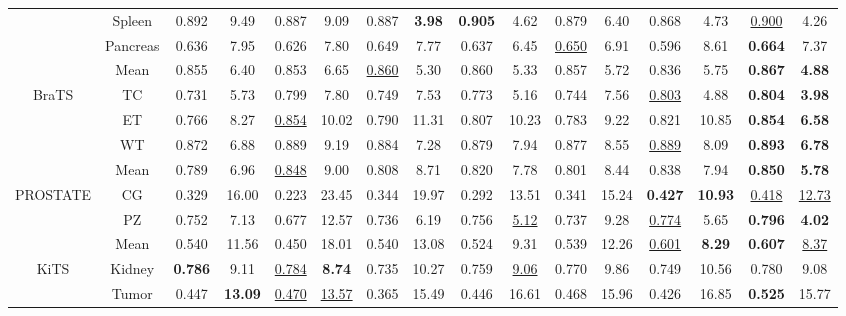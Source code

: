 \documentclass[twocolumn,final,10pt]{elsarticle}
\newcommand\und[1]{\underline{#1}}
\newcommand{\rev}[1]{{\color{black}#1}}
\begin{document}
\begin{table}[h!]
\begin{tabular}{c|c|cccccccccccccc}
 & Spleen & 0.892 & 9.49 & 0.887 & 9.09 & 0.887 & \textbf{3.98} & \textbf{0.905} & 4.62 & 0.879 & 6.40 & 0.868 & 4.73 & \und{0.900} & 4.26\\
 & Pancreas & 0.636 & 7.95 & 0.626 & 7.80 & 0.649 & 7.77 & 0.637 & 6.45 & \und{0.650} & 6.91 & 0.596 & 8.61 & \textbf{0.664} & 7.37\\
 \rowcolor{gray!20} & Mean & 0.855 & 6.40 & 0.853 & 6.65 & \und{0.860} & 5.30 & 0.860 & 5.33 & 0.857 & 5.72 & 0.836 & 5.75 & \textbf{0.867} & \textbf{4.88}\\
 \midrule
\multirow{4}{*}{BraTS} & TC & 0.731 & 5.73 & 0.799 & 7.80 & 0.749 & 7.53 & 0.773 & 5.16 & 0.744 & 7.56 & \und{0.803} & 4.88 & \textbf{0.804} & \textbf{3.98}\\ 
 & ET & 0.766 & 8.27 & \und{0.854} & 10.02 & 0.790 & 11.31 & 0.807 & 10.23 & 0.783 & 9.22 & 0.821 & 10.85 & \textbf{0.854} & \textbf{6.58}\\
& WT & 0.872 & 6.88 & 0.889 & 9.19 & 0.884 & 7.28 & 0.879 & 7.94 & 0.877 & 8.55 & \und{0.889} & 8.09 & \textbf{0.893} & \textbf{6.78}\\ 
\rowcolor{gray!20} & Mean & 0.789 & 6.96 & \und{0.848} & 9.00 & 0.808 & 8.71 & 0.820 & 7.78 & 0.801 & 8.44 & 0.838 & 7.94 & \textbf{0.850} & \textbf{5.78}\\  
 \midrule
 \multirow{3}{*}{\rev{PROSTATE}} & \rev{CG} & \rev{0.329} & \rev{16.00} & \rev{0.223} & \rev{23.45} & \rev{0.344} & \rev{19.97} & \rev{0.292} & \rev{13.51} & \rev{0.341} & \rev{15.24} & \rev{\textbf{0.427}} & \rev{\textbf{10.93}} & \rev{\und{0.418}} & \rev{\underline{12.73}} \\ 
 & \rev{PZ} & \rev{0.752} & \rev{7.13} & \rev{0.677} & \rev{12.57} & \rev{0.736} & \rev{6.19} & \rev{0.756} & \rev{\underline{5.12}} & \rev{0.737} & \rev{9.28} & \rev{\und{0.774}} & \rev{5.65} & \rev{\textbf{0.796}} & \rev{\textbf{4.02}} \\
\rowcolor{gray!20} & \rev{Mean} & \rev{0.540} & \rev{11.56} & \rev{0.450} & \rev{18.01} & \rev{0.540} & \rev{13.08} & \rev{0.524} & \rev{9.31} & \rev{0.539} & \rev{12.26} & \rev{\und{0.601}} & \rev{\textbf{8.29}} & \rev{\textbf{0.607}} & \rev{\underline{8.37}} \\  
\midrule
\multirow{3}{*}{\rev{KiTS}} & \rev{Kidney} & \rev{\textbf{0.786}} & \rev{9.11} & \rev{\und{0.784}} & \rev{\textbf{8.74}} & \rev{0.735} & \rev{10.27} & \rev{0.759} & \rev{\underline{9.06}} & \rev{0.770} & \rev{9.86} & \rev{0.749} & \rev{10.56} & \rev{0.780} & \rev{9.08} \\ 
& \rev{Tumor} & \rev{0.447} & \rev{\textbf{13.09}} & \rev{\und{0.470}} & \rev{\und{13.57}} & \rev{0.365} & \rev{15.49} & \rev{0.446} & \rev{16.61} & \rev{0.468} & \rev{15.96} & \rev{0.426} & \rev{16.85} & \rev{\textbf{0.525}} & \rev{15.77} \\

\end{tabular}
\end{table}
\end{document}
